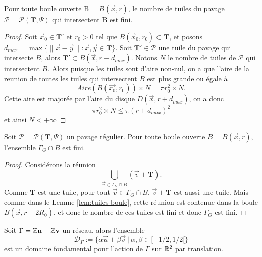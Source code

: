 \begin{lemma}
	\label{lem:tuiles-boule}
	Pour toute boule ouverte B = $B(\vec{x}, r)$, le nombre de tuiles
	du pavage $\mathcal{P} = \mathcal{P}(\mathbf{T}, \Psi)$ qui intersectent B est fini.
\end{lemma}
\begin{proof}
	Soit $\vec{x}_0 \in \mathbf{T}^\circ$ et $r_0 > 0$ tel que
	$B(\vec{x}_0, r_0) \subset \mathbf{T}$, et
	posons $d_{max} = \max \{\|\vec{x} - \vec{y}\|:\vec{x}, \vec{y} \in
	\mathbf{T}\}$.
	Soit $\mathbf{T}' \in \mathcal{P}$ une tuile du pavage qui intersecte $B$,
	alors $\mathbf{T}' \subset B(\vec{x}, r + d_{max})$.
	Notons $N$ le nombre de tuiles de $\mathcal{P}$ qui intersectent $B$.
	Alors puisque les tuiles sont d'aire non-nul, on a que
	l'aire de la reunion de toutes les tuiles qui intersectent $B$
	est plus grande ou égale à
	\begin{equation*}
		Aire(B(\vec{x_0}, r_0)) \times N = \pi r_0^2 \times N.
	\end{equation*}
	Cette aire est majorée par l'aire du disque $D(\vec{x}, r + d_{max})$,
	on a donc
	\begin{equation*}
		\pi r_0^2 \times N \leq \pi(r + d_{max})^2
	\end{equation*}
	et ainsi $N < +\infty$
\end{proof}

\begin{lemma}
	\label{lem:translations-boule}
	Soit $\mathcal{P} = \mathcal{P}(\mathbf{T}, \Psi)$ un pavage régulier.
	Pour toute boule ouverte $B = B(\vec{x}, r)$, l'ensemble
	$\Gamma_G \cap B$ est fini.
\end{lemma}
\begin{proof}
	Considérons la réunion
	\begin{equation*}
		\bigcup_{\vec{v} \in \Gamma_G \cap B} (\vec{v} + \mathbf{T}).
	\end{equation*}
	Comme $\mathbf{T}$ est une tuile, pour tout $\vec{v} \in \Gamma_G \cap B$,
	$\vec{v} + \mathbf{T}$ est aussi une tuile.
	Mais comme dans le Lemme \ref{lem:tuiles-boule}, cette réunion est
	contenue dans la boule ${B(\vec{x}, r + 2R_0)}$, et donc le nombre de
	ces tuiles est fini et donc $\Gamma_G$ est fini.
\end{proof}

\begin{lemma}
	\label{lem:reseau-domaine-fondamental}
	Soit $\Gamma = \mathbb{Z}\mathbf{u} + \mathbb{Z}\mathbf{v}$ un réseau, alors l'ensemble
	\begin{equation*}
		\mathcal{D}_\Gamma :=
		\{\alpha\vec{u} + \beta\vec{v}\ |\ \alpha, \beta \in [-1/2, 1/2[\}
	\end{equation*}
	est un domaine fondamental pour l'action de $\Gamma$ sur $\mathbb{R}^2$ par
	translation.
\end{lemma}

